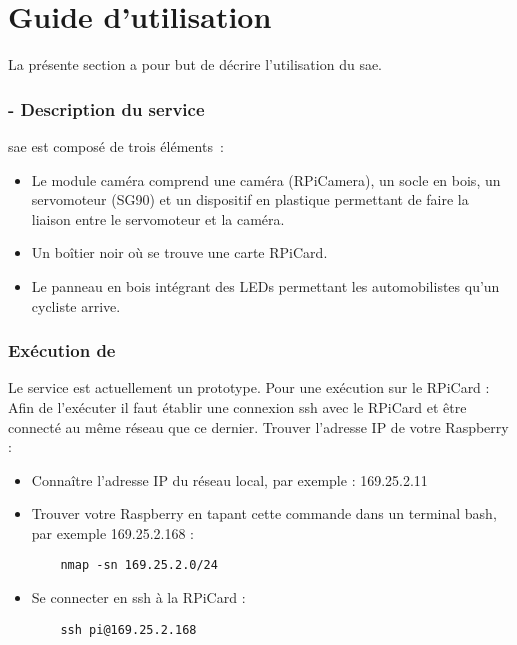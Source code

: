 \part{Guide d'utilisation}
La présente section a pour but de décrire l'utilisation du \gls{sae}.

\section{ - Description du service}
\label{sec:description_clearWay}

\gls{sae} est composé de trois éléments :
\begin{itemize}
    \item Le module caméra comprend une caméra (\gls{RPiCamera}), un socle en bois, un servomoteur (\gls{SG90})  
    et un dispositif en plastique permettant de faire la liaison entre le servomoteur et la caméra.
    \item Un boîtier noir où se trouve une carte \gls{RPiCard}.
    \item Le panneau en bois intégrant des LEDs permettant les automobilistes qu'un cycliste arrive.
\end{itemize}

\section{Exécution de }
\label{sec:execution_clearWay}

Le service est actuellement un prototype. Pour une exécution sur le \gls{RPiCard} :
Afin de l'exécuter il faut établir une connexion ssh avec le \gls{RPiCard} et être connecté au même réseau que ce dernier.
Trouver l'adresse IP de votre Raspberry :
\begin{itemize}
    \item Connaître l'adresse IP du réseau local, par exemple : 169.25.2.11
    \item Trouver votre Raspberry en tapant cette commande dans un terminal bash, par exemple 169.25.2.168 : 
\begin{verbatim}
    nmap -sn 169.25.2.0/24
\end{verbatim}
    \item Se connecter en ssh à la \gls{RPiCard} :
\begin{verbatim}
    ssh pi@169.25.2.168
\end{verbatim}
\end{itemize}

